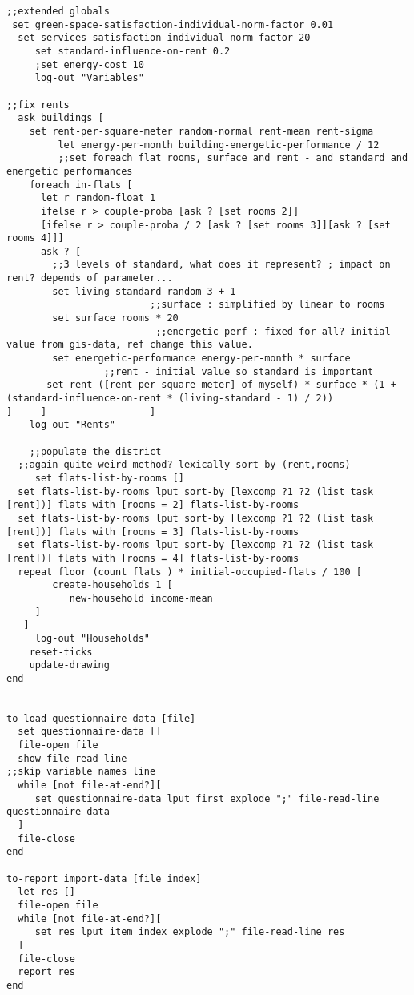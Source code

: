 \documentclass[english]{article}
\begin{document}
\begin{lstlisting}[basicstyle={\scriptsize}]
       ;;extended globals
 set green-space-satisfaction-individual-norm-factor 0.01
  set services-satisfaction-individual-norm-factor 20
     set standard-influence-on-rent 0.2
     ;set energy-cost 10
     log-out "Variables"      

;;fix rents
  ask buildings [
    set rent-per-square-meter random-normal rent-mean rent-sigma
         let energy-per-month building-energetic-performance / 12
         ;;set foreach flat rooms, surface and rent - and standard and energetic performances
    foreach in-flats [
      let r random-float 1
      ifelse r > couple-proba [ask ? [set rooms 2]]
      [ifelse r > couple-proba / 2 [ask ? [set rooms 3]][ask ? [set rooms 4]]]
      ask ? [
        ;;3 levels of standard, what does it represent? ; impact on rent? depends of parameter...
        set living-standard random 3 + 1 
                         ;;surface : simplified by linear to rooms
        set surface rooms * 20
                          ;;energetic perf : fixed for all? initial value from gis-data, ref change this value.
        set energetic-performance energy-per-month * surface
                 ;;rent - initial value so standard is important 
       set rent ([rent-per-square-meter] of myself) * surface * (1 + (standard-influence-on-rent * (living-standard - 1) / 2))                ]     ]                  ]
    log-out "Rents"

    ;;populate the district
  ;;again quite weird method? lexically sort by (rent,rooms)
     set flats-list-by-rooms []
  set flats-list-by-rooms lput sort-by [lexcomp ?1 ?2 (list task [rent])] flats with [rooms = 2] flats-list-by-rooms
  set flats-list-by-rooms lput sort-by [lexcomp ?1 ?2 (list task [rent])] flats with [rooms = 3] flats-list-by-rooms
  set flats-list-by-rooms lput sort-by [lexcomp ?1 ?2 (list task [rent])] flats with [rooms = 4] flats-list-by-rooms
  repeat floor (count flats ) * initial-occupied-flats / 100 [
        create-households 1 [
           new-household income-mean
     ]
   ]
     log-out "Households" 
    reset-ticks
    update-drawing
end


to load-questionnaire-data [file]
  set questionnaire-data []
  file-open file
  show file-read-line
;;skip variable names line
  while [not file-at-end?][
     set questionnaire-data lput first explode ";" file-read-line questionnaire-data
  ]
  file-close
end

to-report import-data [file index]
  let res []
  file-open file
  while [not file-at-end?][
     set res lput item index explode ";" file-read-line res
  ]
  file-close
  report res
end
\end{lstlisting}
\end{document}
